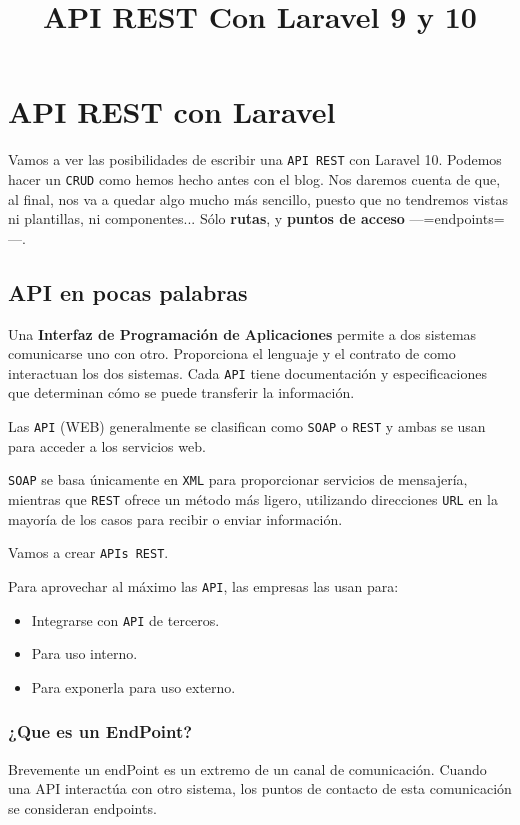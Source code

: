 \documentclass[11pt]{article}
\date{}
\title{API REST Con Laravel 9 y 10}
\begin{document}
\maketitle
\setcounter{tocdepth}{3}
\tableofcontents

\setlength\parindent{10pt}

\section{API REST con Laravel}
\label{sec:org1dcb514}
Vamos a ver las posibilidades de escribir una \texttt{API REST} con
Laravel 10. Podemos hacer un \texttt{CRUD} como hemos hecho antes con el
blog. Nos daremos cuenta de que, al final, nos va a quedar algo mucho
más sencillo, puesto que no tendremos vistas ni plantillas, ni
componentes... Sólo \textbf{rutas}, y \textbf{puntos de acceso} —=endpoints=—.

\subsection{API en pocas palabras}
\label{sec:orgb75edc4}
Una \textbf{Interfaz de Programación de Aplicaciones} permite a dos sistemas
comunicarse uno con otro. Proporciona el lenguaje y el contrato de
como interactuan los dos sistemas. Cada \texttt{API} tiene documentación y
especificaciones que determinan cómo se puede transferir la
información.

Las \texttt{API} (WEB) generalmente se clasifican como \texttt{SOAP} o \texttt{REST} y
ambas se usan para acceder a los servicios web.

\texttt{SOAP} se basa únicamente en \texttt{XML} para proporcionar servicios de
mensajería, mientras que \texttt{REST} ofrece un método más ligero, utilizando
direcciones \texttt{URL} en la mayoría de los casos para recibir o enviar
información.

Vamos a crear \texttt{APIs REST}.

Para aprovechar al máximo las \texttt{API}, las empresas las usan para:
\begin{itemize}
\item Integrarse con \texttt{API} de terceros.
\item Para uso interno.
\item Para exponerla para uso externo.
\end{itemize}



\page


\subsubsection{¿Que es un EndPoint?}
\label{sec:org609c08c}
Brevemente un endPoint es un extremo de un canal de
comunicación. Cuando una API interactúa con otro sistema, los puntos
de contacto de esta comunicación se consideran endpoints.
\end{document}
